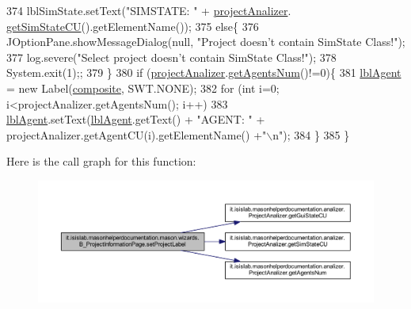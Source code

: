 \begin{DoxyCode}
374             lblSimState.setText(\textcolor{stringliteral}{"SIMSTATE: "} + \hyperlink{classit_1_1isislab_1_1masonhelperdocumentation_1_1mason_1_1wizards_1_1_b___project_information_page_aa0397b2de6a01a90d6d2eb52645f5173}{projectAnalizer}.
      \hyperlink{classit_1_1isislab_1_1masonhelperdocumentation_1_1analizer_1_1_project_analizer_ab45de2e388d612362f7c79004aa73788}{getSimStateCU}().getElementName());
375         \textcolor{keywordflow}{else}\{
376             JOptionPane.showMessageDialog(null, \textcolor{stringliteral}{"Project doesn't contain SimState Class!"});
377             log.severe(\textcolor{stringliteral}{"Select project doesn't contain SimState Class!"});
378             System.exit(1);;
379         \}           
380         \textcolor{keywordflow}{if} (\hyperlink{classit_1_1isislab_1_1masonhelperdocumentation_1_1mason_1_1wizards_1_1_b___project_information_page_aa0397b2de6a01a90d6d2eb52645f5173}{projectAnalizer}.\hyperlink{classit_1_1isislab_1_1masonhelperdocumentation_1_1analizer_1_1_project_analizer_a48a20f5da4980049099e61b2586ee568}{getAgentsNum}()!=0)\{
381             \hyperlink{classit_1_1isislab_1_1masonhelperdocumentation_1_1mason_1_1wizards_1_1_b___project_information_page_a13700876bf889b097f466ac7d3e7128c}{lblAgent} = \textcolor{keyword}{new} Label(\hyperlink{classit_1_1isislab_1_1masonhelperdocumentation_1_1mason_1_1wizards_1_1_b___project_information_page_a5463a1c435b5fdb6fc4ca2009d7ed215}{composite}, SWT.NONE);
382             \textcolor{keywordflow}{for} (\textcolor{keywordtype}{int} i=0; i<projectAnalizer.getAgentsNum(); i++)
383                 \hyperlink{classit_1_1isislab_1_1masonhelperdocumentation_1_1mason_1_1wizards_1_1_b___project_information_page_a13700876bf889b097f466ac7d3e7128c}{lblAgent}.setText(\hyperlink{classit_1_1isislab_1_1masonhelperdocumentation_1_1mason_1_1wizards_1_1_b___project_information_page_a13700876bf889b097f466ac7d3e7128c}{lblAgent}.getText() + \textcolor{stringliteral}{"AGENT: "} + 
      projectAnalizer.getAgentCU(i).getElementName() +\textcolor{stringliteral}{"\(\backslash\)n"});
384         \}
385     \}
\end{DoxyCode}


Here is the call graph for this function\-:\nopagebreak
\begin{figure}[H]
\begin{center}
\leavevmode
\includegraphics[width=350pt]{classit_1_1isislab_1_1masonhelperdocumentation_1_1mason_1_1wizards_1_1_b___project_information_page_afa7497cd5a5b4b3c5fb7f7f1397ebb72_cgraph}
\end{center}
\end{figure}




